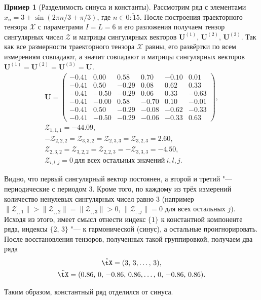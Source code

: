 \documentclass[specialist,
    substylefile = spbu_report.rtx,
    subf,href,colorlinks=true, 12pt]{disser}
\theoremstyle{plain}
\theoremstyle{definition}
\newtheorem{example}{Пример}[section]
\theoremstyle{remark}
\begin{document}
    \begin{example}[Разделимость синуса и константы]
        Рассмотрим ряд с элементами $x_n=3+\sin(2\pi n / 3 + \pi/3)$, где $n\in \overline{0:15}$.
        После построения траекторного тензора $\mathcal{X}$ с параметрами $I=L=6$ и его разложения получаем тензор
        сингулярных чисел $\mathcal{Z}$ и матрицы сингулярных векторов $\mathbf{U}^{(1)},\, \mathbf{U}^{(2)},\,\mathbf{U}^{(3)}$.
        Так как все размерности траекторного тензора $\mathcal{X}$ равны, его развёртки по всем
        измерениям совпадают, а значит совпадают и матрицы сингулярных векторов $\mathbf{U}^{(1)}=\mathbf{U}^{(2)}=\mathbf{U}^{(3)}=\mathbf{U}$.
        \begin{gather*}
            \mathbf{U}=
            \begin{pmatrix}
                -0.41 & 0.00  & 0.58  & 0.70  & -0.10 & 0.01  \\
                -0.41 & 0.50  & -0.29 & 0.08  & 0.62  & 0.33  \\
                -0.41 & -0.50 & -0.29 & 0.06  & 0.33  & -0.63 \\
                -0.41 & -0.00 & 0.58  & -0.70 & 0.10  & -0.01 \\
                -0.41 & 0.50  & -0.29 & -0.08 & -0.62 & -0.33 \\
                -0.41 & -0.50 & -0.29 & -0.06 & -0.33 & 0.63
            \end{pmatrix},\\
            \mathcal{Z}_{1,1,1}=-44.09,\\
            -\mathcal{Z}_{2,2,2}=\mathcal{Z}_{3,3,2}=\mathcal{Z}_{2,3,3}=\mathcal{Z}_{3,2,3}=2.60,\\
            \mathcal{Z}_{2,3,2}=\mathcal{Z}_{3,2,2}=\mathcal{Z}_{2,2,3}=-\mathcal{Z}_{3,3,3}=-4.50,\\
            \mathcal{Z}_{i,l,j}=0~\text{для всех остальных значений}~i, l, j.
        \end{gather*}

        Видно, что первый сингулярный вектор постоянен, а второй и третий "--- периодические с периодом 3.
        Кроме того, по каждому из трёх измерений количество ненулевых сингулярных чисел равно 3
        (например $\|\mathcal{Z}_{,,1}\|>\|\mathcal{Z}_{,,2}\|=\|\mathcal{Z}_{,,3}\|>0$, $\|\mathcal{Z}_{,,j}\|=0$ для всех остальных $j$).
        Исходя из этого, имеет смысл отнести индекс $\{1\}$ к константной компоненте ряда, индексы $\{2,\, 3\}$ "---
        к гармонической (синус), а остальные проигнорировать.
        После восстановления тензоров, полученных такой группировкой, получаем два ряда
        \begin{gather*}
            \hat{\tX}=(3,\, 3,\ldots,\, 3),\\
            \tilde{\tX}=(0.86,\, 0,\, -0.86,\,  0.86,\ldots,\, 0,\, -0.86,\, 0.86).
        \end{gather*}

        Таким образом, константный ряд отделился от синуса.
    \end{example}
\end{document}
